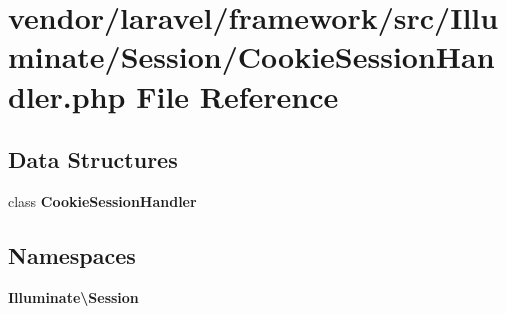 \section{vendor/laravel/framework/src/\+Illuminate/\+Session/\+Cookie\+Session\+Handler.php File Reference}
\label{_cookie_session_handler_8php}
\subsection*{Data Structures}
\begin{DoxyCompactItemize}
\item 
class {\bf Cookie\+Session\+Handler}
\end{DoxyCompactItemize}
\subsection*{Namespaces}
\begin{DoxyCompactItemize}
\item 
 {\bf Illuminate\textbackslash{}\+Session}
\end{DoxyCompactItemize}
